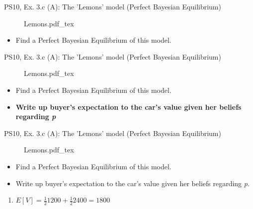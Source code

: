 \begin{frame}{PS10, Ex. 3.c (A): The 'Lemons' model (Perfect Bayesian Equilibrium)}
    \begin{figure}[!h]
      \center {}
      {Lemons.pdf_tex}
    \end{figure}
    \vspace{-8pt}
    \begin{itemize}
      \item[(c)] Find a Perfect Bayesian Equilibrium of this model.
    \end{itemize}
    \vfill\null
\end{frame}
\begin{frame}{PS10, Ex. 3.c (A): The 'Lemons' model (Perfect Bayesian Equilibrium)}
    \begin{figure}[!h]
      \center {}
      {Lemons.pdf_tex}
    \end{figure}
    \vspace{-8pt}
    \begin{itemize}
      \item[(c)] Find a Perfect Bayesian Equilibrium of this model.
    \end{itemize}
    \vspace{-8pt}
    \begin{multicols}{2}
      \begin{itemize}
        \item[Step 1:] \textbf{Write up buyer's expectation to the car's value given her beliefs regarding \textit{p}}
      \end{itemize}
      \vfill\null\columnbreak
      \vfill\null
    \end{multicols}
\end{frame}
\begin{frame}{PS10, Ex. 3.c (A): The 'Lemons' model (Perfect Bayesian Equilibrium)}
    \begin{figure}[!h]
      \center {}
      {Lemons.pdf_tex}
    \end{figure}
    \vspace{-8pt}
    \begin{itemize}
      \item[(c)] Find a Perfect Bayesian Equilibrium of this model.
    \end{itemize}
    \vspace{-8pt}
    \begin{multicols}{2}
      \begin{itemize}
        \item[Step 1:] Write up buyer's expectation to the car's value given her beliefs regarding \textit{p}.
      \end{itemize}
      \vfill\null\columnbreak
      \begin{enumerate}
        \item $E[V]=\frac{1}{2}1200+\frac{1}{2}2400=1800$
      \end{enumerate}
      \vfill\null
    \end{multicols}
\end{frame}
